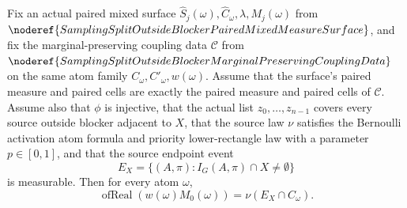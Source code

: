 \begin{helper}
Fix an actual paired mixed surface
\(\widehat S_j(\omega),\widehat C_\omega,\lambda,M_j(\omega)\) from
\(\noderef{SamplingSplitOutsideBlockerPairedMixedMeasureSurface}\), and fix
the marginal-preserving coupling data
\(\mathcal C\) from
\(\noderef{SamplingSplitOutsideBlockerMarginalPreservingCouplingData}\) on
the same atom family \(C_\omega,C'_\omega,w(\omega)\).  Assume that the
surface's paired measure and paired cells are exactly the paired measure and
paired cells of \(\mathcal C\).  Assume also that \(\phi\) is injective, that
the actual list \(z_0,\ldots,z_{n-1}\) covers every source outside blocker
adjacent to \(X\), that the source law \(\nu\) satisfies the Bernoulli
activation atom formula and priority lower-rectangle law with a parameter
\(p\in[0,1]\), and that the source endpoint event
\[
  E_X=\{(A,\pi): I_G(A,\pi)\cap X\ne\emptyset\}
\]
is measurable.  Then for every atom \(\omega\),
\[
  \operatorname{ofReal}(w(\omega)M_0(\omega))
  =
  \nu(E_X\cap C_\omega).
\]
\end{helper}
